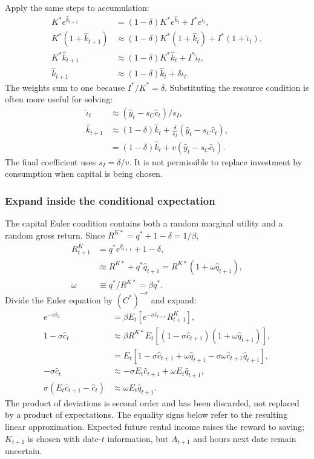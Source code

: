 Apply the same steps to accumulation:
\begin{align}
K^*e^{\hat k_{t+1}}&=(1-\delta)K^*e^{\hat k_t}+I^*e^{\hat\iota_t},\\
K^*(1+\hat k_{t+1})&\approx(1-\delta)K^*(1+\hat k_t)
 +I^*(1+\hat\iota_t),\\
K^*\hat k_{t+1}&\approx(1-\delta)K^*\hat k_t+I^*\hat\iota_t,\\
\hat k_{t+1}&\approx(1-\delta)\hat k_t+\delta\hat\iota_t.\label{eq:rbc-linear-k}
\end{align}
The weights sum to one because $I^*/K^*=\delta$. Substituting the resource
condition is often more useful for solving:
\begin{align}
\hat\iota_t&\approx(\hat y_t-s_C\hat c_t)/s_I,\\
\hat k_{t+1}&\approx(1-\delta)\hat k_t
 +\frac{\delta}{s_I}(\hat y_t-s_C\hat c_t),\\
&=(1-\delta)\hat k_t+v(\hat y_t-s_C\hat c_t).
\end{align}
The final coefficient uses $s_I=\delta/v$. It is not permissible to replace
investment by consumption when capital is being chosen.

\subsubsection{Expand inside the conditional expectation}

The capital Euler condition contains both a random marginal utility and a
random gross return. Since $R^{K*}=q^*+1-\delta=1/\beta$,
\begin{align}
R^K_{t+1}&=q^*e^{\hat q_{t+1}}+1-\delta,\\
&\approx R^{K*}+q^*\hat q_{t+1}
 =R^{K*}(1+\omega\hat q_{t+1}),\\
\omega&\equiv q^*/R^{K*}=\beta q^*.
\end{align}
Divide the Euler equation by $(C^*)^{-\sigma}$ and expand:
\begin{align}
e^{-\sigma\hat c_t}
 &=\beta E_t[e^{-\sigma\hat c_{t+1}}R^K_{t+1}],\\
1-\sigma\hat c_t
 &\approx\beta R^{K*}E_t[(1-\sigma\hat c_{t+1})
                          (1+\omega\hat q_{t+1})],\\
&=E_t[1-\sigma\hat c_{t+1}+\omega\hat q_{t+1}
             -\sigma\omega\hat c_{t+1}\hat q_{t+1}],\\
-\sigma\hat c_t&\approx-\sigma E_t\hat c_{t+1}
                         +\omega E_t\hat q_{t+1},\\
\sigma(E_t\hat c_{t+1}-\hat c_t)
 &\approx\omega E_t\hat q_{t+1}.\label{eq:rbc-linear-euler}
\end{align}
The product of deviations is second order and has been discarded, not replaced
by a product of expectations. The equality signs below refer to the resulting
linear approximation. Expected future rental income raises the reward to
saving; $K_{t+1}$ is chosen with date-$t$ information, but $A_{t+1}$ and hours
next date remain uncertain.

